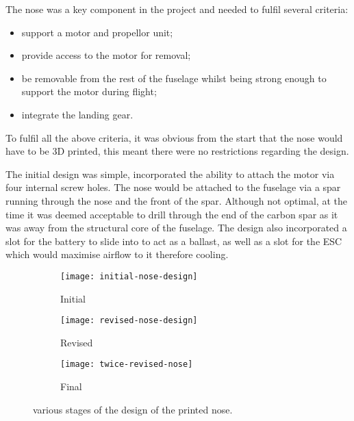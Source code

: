 \documentclass[../../main.tex]{subfiles}
\begin{document}
The nose was a key component in the project and needed to fulfil several criteria:

\begin{itemize}
    \item support a motor and propellor unit;
    \item provide access to the motor for removal;
    \item be removable from the rest of the fuselage whilst being strong enough to support the motor during flight;
    \item integrate the landing gear.
\end{itemize}

To fulfil all the above criteria, it was obvious from the start that the nose would have to be 3D printed, this meant there were no restrictions regarding the design.  

The initial design was simple, incorporated the ability to attach the motor via four internal screw holes.
The nose would be attached to the fuselage via a spar running through the nose and the front of the spar.
Although not optimal, at the time it was deemed acceptable to drill through the end of the carbon spar as it was away from the structural core of the fuselage.
The design also incorporated a slot for the battery to slide into to act as a ballast, as well as a slot for the ESC which would maximise airflow to it therefore cooling.

\begin{figure}[H]
    \centering
    \begin{subfigure}[b]{0.6\columnwidth}
        \centering
        \texttt{[image: initial-nose-design]}
        \caption{Initial}
        \label{fig:nose-design-progression:initial}
    \end{subfigure}
    
    \begin{subfigure}[b]{0.6\columnwidth}
        \centering
        \texttt{[image: revised-nose-design]}
        \caption{Revised}
        \label{fig:nose-design-progression:revised}
    \end{subfigure}

    \begin{subfigure}[b]{0.6\columnwidth}
        \centering
        \texttt{[image: twice-revised-nose]}
        \caption{Final}
        \label{fig:nose-design-progression:final}
    \end{subfigure}
    
    \caption{various stages of the design of the printed nose.}
    \label{fig:nose-design-progression}
\end{figure} 
\end{document}
